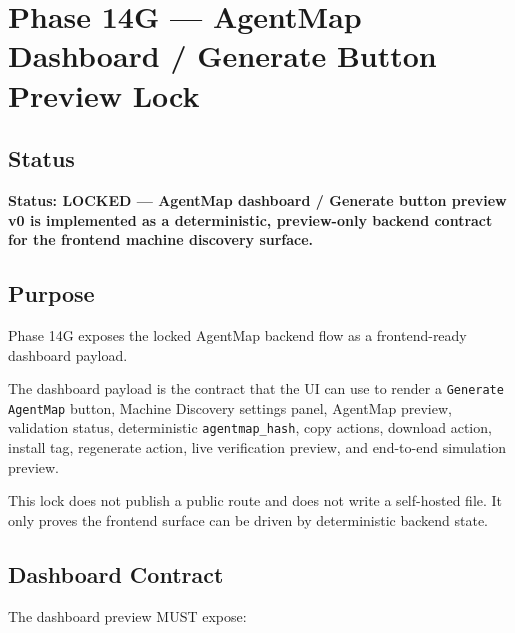 \section{Phase 14G --- AgentMap Dashboard / Generate Button Preview Lock}
\label{sec:phase14-agentmap-dashboard-lock}

\subsection{Status}

\textbf{Status: LOCKED --- AgentMap dashboard / Generate button preview v0 is implemented as a deterministic, preview-only backend contract for the frontend machine discovery surface.}

\subsection{Purpose}

Phase 14G exposes the locked AgentMap backend flow as a frontend-ready dashboard payload.

The dashboard payload is the contract that the UI can use to render a \texttt{Generate AgentMap} button, Machine Discovery settings panel, AgentMap preview, validation status, deterministic \texttt{agentmap\_hash}, copy actions, download action, install tag, regenerate action, live verification preview, and end-to-end simulation preview.

This lock does not publish a public route and does not write a self-hosted file. It only proves the frontend surface can be driven by deterministic backend state.

\subsection{Dashboard Contract}

The dashboard preview MUST expose:


